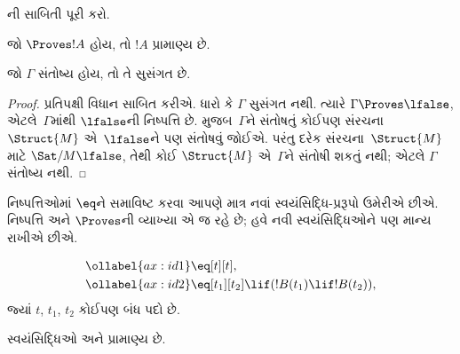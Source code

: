 
\begin{prob}
  ની સાબિતી પૂરી કરો.
\end{prob}

\begin{cor}
જો $\Proves !A$ હોય, તો $!A$ પ્રામાણ્ય છે.
\end{cor}

\begin{cor}
જો $\Gamma$ સંતોષ્ય હોય, તો તે સુસંગત છે.
\end{cor}

\begin{proof}
પ્રતિપક્ષી વિધાન સાબિત કરીએ. ધારો કે $\Gamma$ સુસંગત નથી. ત્યારે
$\Gamma \Proves \lfalse$, એટલે~$\Gamma$માંથી $\lfalse$ની
નિષ્પત્તિ છે.  મુજબ~$\Gamma$ને સંતોષતું
કોઈપણ સંરચના~$\Struct{M}$
એ~$\lfalse$ને પણ સંતોષવું જોઈએ. પરંતુ
દરેક સંરચના~$\Struct{M}$ માટે
$\Sat/{M}{\lfalse}$, તેથી કોઈ
$\Struct{M}$ એ~$\Gamma$ને સંતોષી શકતું નથી;
એટલે $\Gamma$ સંતોષ્ય નથી.
\end{proof}
\endgroup


  \begingroup
\makeatletter{}\makeatother


\label{guunit:OLP-0125}


નિષ્પત્તિઓમાં $\eq$ને સમાવિષ્ટ કરવા આપણે માત્ર નવાં
સ્વયંસિદ્ધિ-પ્રરૂપો ઉમેરીએ છીએ. નિષ્પત્તિ અને $\Proves$ની વ્યાખ્યા
એ જ રહે છે; હવે નવી સ્વયંસિદ્ધિઓને પણ માન્ય રાખીએ છીએ.

\begin{defn}[તાદાત્મ્ય માટેની સ્વયંસિદ્ધિઓ]
\begin{align}
\ollabel{ax:id1} & \eq[t][t], \\
\ollabel{ax:id2} & \eq[t_1][t_2] \lif (!B(t_1) \lif
  !B(t_2)),
\end{align}
જ્યાં $t$, $t_1$, $t_2$ કોઈપણ બંધ પદો છે.
\end{defn}

\begin{prop}
  સ્વયંસિદ્ધિઓ  અને  પ્રામાણ્ય છે.
\end{prop}

